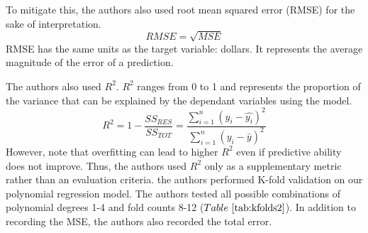 \documentclass[conference, 11pt]{IEEEtran}
\begin{document}
To mitigate this, the authors also used root mean squared error (RMSE) for the sake of interpretation.
\[
RMSE = \sqrt{MSE}
\]
RMSE has the same units as the target variable: dollars. It represents the average magnitude of the error of a prediction.

The authors also used $R^2$. $R^2$ ranges from 0 to 1 and represents the proportion of the variance that can be explained by the dependant variables using the model.
\[
R^2 = 1 - \frac{SS_{RES}}{SS_{TOT}} = \frac{\sum_{i=1}^n(y_i - \hat{y_i})^2}{\sum_{i=1}^n(y_i - \bar{y})^2}
\]
However, note that overfitting can lead to higher $R^2$ even if predictive ability does not improve. Thus, the authors used $R^2$ only as a supplementary metric rather than 
 an evaluation criteria.
the authors performed K-fold validation on our polynomial regression model. The authors tested all possible combinations of polynomial degrees 1-4 and fold counts 8-12 ($Table~\ref{tab:kfolds2}$). In addition to recording the MSE, the authors also recorded the total error. 
\end{document}
